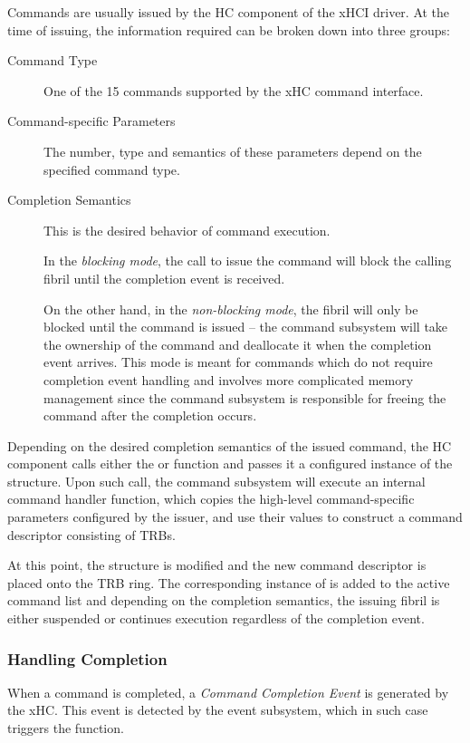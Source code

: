 Commands are usually issued by the HC component of the xHCI driver. At the time
of issuing, the information required can be broken down into three groups:
%
\begin{description}
	\item[Command Type]
		One of the 15 commands supported by the xHC command interface.
	\item[Command-specific Parameters]
		The number, type and semantics of these parameters depend on the
		specified command type.
	\item[Completion Semantics]
		This is the desired behavior of command execution.

		In the \textit{blocking mode}, the call to issue the command will block
		the calling fibril until the completion event is received.

		On the other hand, in the \textit{non-blocking mode}, the fibril will
		only be blocked until the command is issued -- the command subsystem
		will take the ownership of the command and deallocate it when the
		completion event arrives. This mode is meant for commands which do not
		require completion event handling and involves more complicated memory
		management since the command subsystem is responsible for freeing the
		command after the completion occurs.
\end{description}

Depending on the desired completion semantics of the issued command, the HC
component calls either the  or 
function and passes it a configured instance of the  structure.
Upon such call, the command subsystem will execute an internal command handler
function, which copies the high-level command-specific parameters configured by
the issuer, and use their values to construct a command descriptor consisting of
TRBs.

At this point, the  structure is modified and the new
command descriptor is placed onto the TRB ring. The corresponding instance of
 is added to the active command list and depending on the
completion semantics, the issuing fibril is either suspended or continues
execution regardless of the completion event.


\subsubsection{Handling Completion}

When a command is completed, a \textit{Command Completion Event} is generated by
the xHC. This event is detected by the event subsystem, which in such case
triggers the  function.

